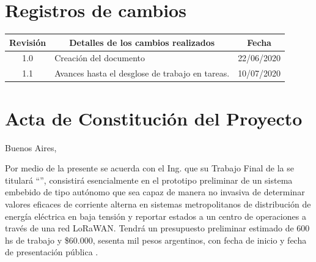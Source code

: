 \documentclass[11pt]{charter}
\begin{document}
\maketitle
\thispagestyle{empty}
\pagebreak


\thispagestyle{empty}
{\setlength{\parskip}{0pt}
\tableofcontents{}
}
\pagebreak


\section{Registros de cambios}
\label{sec:registro}


\begin{table}[ht]
\label{tab:registro}
\centering

\begin{tabularx}{\linewidth}{@{}|c|X|c|@{}}
\hline
\rowcolor[HTML]{C0C0C0} 
Revisión & \multicolumn{1}{c|}{\cellcolor[HTML]{C0C0C0}Detalles de los cambios realizados} & Fecha      \\ \hline
1.0      & Creación del documento                                                          & 22/06/2020 \\ \hline
1.1      & Avances hasta el desglose de trabajo en tareas.                                                                         																						   & 10/07/2020 \\ \hline

\end{tabularx}
\end{table}

\pagebreak



\section{Acta de Constitución del Proyecto}
\label{sec:acta}

\begin{flushright}
Buenos Aires, \fechaInicioName
\end{flushright}

\vspace{2cm}

Por medio de la presente se acuerda con el Ing. \authorname\hspace{1px} que su Trabajo Final de la \degreename\hspace{1px} se titulará ``\ttitle'', consistirá esencialmente en el prototipo preliminar de un sistema embebido de tipo autónomo que sea capaz de manera no invasiva de determinar valores eficaces de corriente alterna en sistemas metropolitanos de distribución de energía eléctrica en baja tensión y reportar estados a un centro de operaciones a través de una red LoRaWAN. Tendrá un presupuesto preliminar estimado de 600 hs de trabajo y \$60.000, sesenta mil pesos argentinos, con fecha de inicio \fechaInicioName\hspace{1px} y fecha de presentación pública \fechaFinalName.
\end{document}
